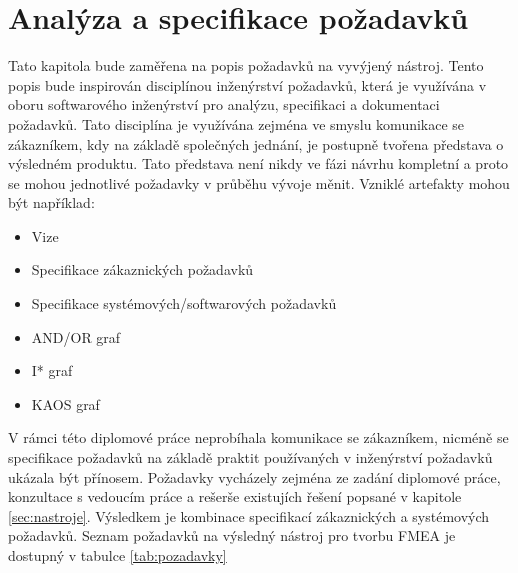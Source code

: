 \chapter{Analýza a specifikace požadavků}
\label{sec:pozadavky}
Tato kapitola bude zaměřena na popis požadavků na vyvýjený nástroj. Tento popis bude inspirován disciplínou inženýrství požadavků, která je využívána v oboru softwarového inženýrství pro analýzu, specifikaci a dokumentaci požadavků. Tato disciplína je využívána zejména ve smyslu komunikace se zákazníkem, kdy na základě společných jednání, je postupně tvořena představa o výsledném produktu. Tato představa není nikdy ve fázi návrhu kompletní a proto se mohou jednotlivé požadavky v průběhu vývoje měnit. Vzniklé artefakty mohou být například:
    \begin{itemize}
    \item Vize
	\item Specifikace zákaznických požadavků
    \item Specifikace systémových/softwarových požadavků
    \item AND/OR graf
    \item I* graf
    \item KAOS graf 
\end{itemize}

V rámci této diplomové práce neprobíhala komunikace se zákazníkem, nicméně se specifikace požadavků na základě praktit používaných v inženýrství požadavků ukázala být přínosem. Požadavky vycházely zejména ze zadání diplomové práce, konzultace s vedoucím práce a rešerše existujích řešení popsané v kapitole \ref{sec:nastroje}. Výsledkem je kombinace specifikací zákaznických a systémových požadavků. Seznam požadavků na výsledný nástroj pro tvorbu FMEA je dostupný v tabulce \ref{tab:pozadavky}
\break
\break
\break
\break
\break




